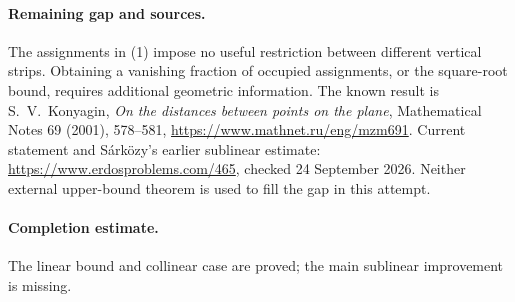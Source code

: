 \paragraph{Remaining gap and sources.}
The assignments in (1) impose no useful restriction between different
vertical strips. Obtaining a vanishing fraction of occupied assignments,
or the square-root bound, requires additional geometric information.
The known result is S.~V.~Konyagin,
\emph{On the distances between points on the plane},
Mathematical Notes 69 (2001), 578--581,
\url{https://www.mathnet.ru/eng/mzm691}.
Current statement and S\'ark\"ozy's earlier sublinear estimate:
\url{https://www.erdosproblems.com/465}, checked 24 September 2026.
Neither external upper-bound theorem is used to fill the gap in this attempt.

\paragraph{Completion estimate.}
The linear bound and collinear case are proved; the main sublinear improvement is missing.
